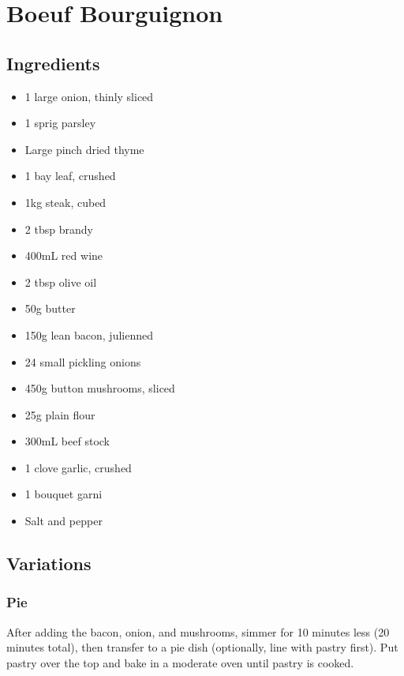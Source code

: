 \section{Boeuf Bourguignon}
  \begin{multicols}{2}
    \subsection{Ingredients}
      \begin{itemize}[noitemsep]
        \item 1 large onion, thinly sliced
        \item 1 sprig parsley
        \item Large pinch dried thyme
        \item 1 bay leaf, crushed
        \item 1kg steak, cubed
        \item 2 tbsp brandy
        \item 400mL red wine
        \item 2 tbsp olive oil
        \item 50g butter
        \item 150g lean bacon, julienned
        \item 24 small pickling onions
        \item 450g button mushrooms, sliced
        \item 25g plain flour
        \item 300mL beef stock
        \item 1 clove garlic, crushed
        \item 1 bouquet garni
        \item Salt and pepper
      \end{itemize}

      \subsection{Variations}
        \subsubsection{Pie}
          After adding the bacon, onion, and mushrooms, simmer for 10 minutes less (20 minutes total), then transfer to a pie dish (optionally, line with pastry first). Put pastry over the top and bake in a moderate oven until pastry is cooked.

      \vfill\null
    \columnbreak

\end{multicols}
